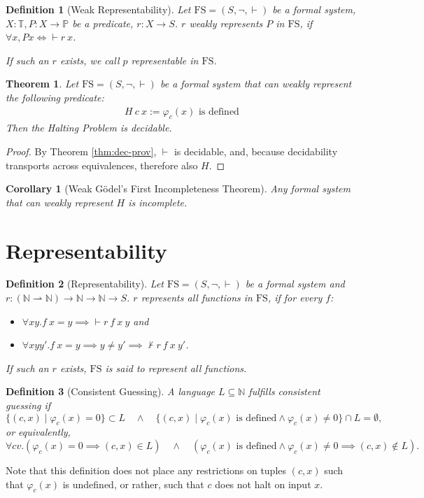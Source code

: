 \documentclass{scrartcl}
\newtheorem{definition}{Definition}
\newtheorem{theorem}{Theorem}
\newtheorem{corollary}{Corollary}[theorem]
\newcommand{\FS}{\mathrm{FS}}
\newcommand{\NN}{\mathbb{N}}
\newcommand{\TT}{\mathbb{T}}
\newcommand{\PP}{\mathbb{P}}
\let\oldvdash\vdash
\renewcommand{\vdash}{{\oldvdash}}
\let\oldnvdash\nvdash
\renewcommand{\nvdash}{{\oldnvdash}}
\begin{document}
\begin{definition}[Weak Representability]
  Let $\FS = (S, \neg, \vdash)$ be a formal system, $X : \TT, P : X \to \PP$ be a predicate, $r : X \to S$. $r$ weakly represents $P$ in $\FS$, if $\forall x, P x \iff \vdash r\ x$.

  If such an $r$ exists, we call $p$ representable in $\FS$.
\end{definition}

\begin{theorem}
  Let $\FS = (S, \neg, \vdash)$ be a formal system that can weakly represent the following predicate:
  \begin{align*}
    H\ c\ x := \varphi_{c}(x) \text{ is defined}
  \end{align*}
  Then the Halting Problem is decidable.
\end{theorem}
\begin{proof}
  By Theorem \ref{thm:dec-prov}, $\vdash$ is decidable, and, because decidability transports across equivalences, therefore also $H$.
\end{proof}
\begin{corollary}[Weak Gödel's First Incompleteness Theorem]
  Any formal system that can weakly represent $H$ is incomplete.
\end{corollary}


\section{Representability}

\begin{definition}[Representability]\label{def:repr}
  Let $\FS = (S, \neg, \vdash)$ be a formal system and $r : (\NN \rightharpoonup \NN) \to \NN \to \NN \to S$. $r$ represents all functions in $\FS$, if for every $f$:
  \begin{itemize}
    \item $\forall x y. f~x = y \implies \vdash r~f~x~y$ and
    \item $\forall x y y'. f~x = y \implies y \neq y' \implies \nvdash r~f~x~y'$.
  \end{itemize}
  If such an $r$ exists, $\FS$ is said to represent all functions.
\end{definition}


\begin{definition}[Consistent Guessing]
  A language $L \subseteq \NN$ fulfills consistent guessing if
  $$\{(c, x) \mid \varphi_{c}(x) = 0\} \subset L \quad \land \quad \{(c, x) \mid \varphi_{c}(x) \text{ is defined} \land \varphi_{c}(x) \neq 0\} \cap L = \emptyset,$$
  or equivalently, %
  $$\forall c v.  (\varphi_{c}(x) = 0 \implies (c, x) \in L) \quad \land \quad (\varphi_{c}(x) \text{ is defined} \land \varphi_{c}(x) \neq 0 \implies (c, x) \notin L).$$
\end{definition}
Note that this definition does not place any restrictions on tuples $(c, x)$ such that $\varphi_{c}(x)$ is undefined, or rather, such that $c$ does not halt on input $x$.
\end{document}
